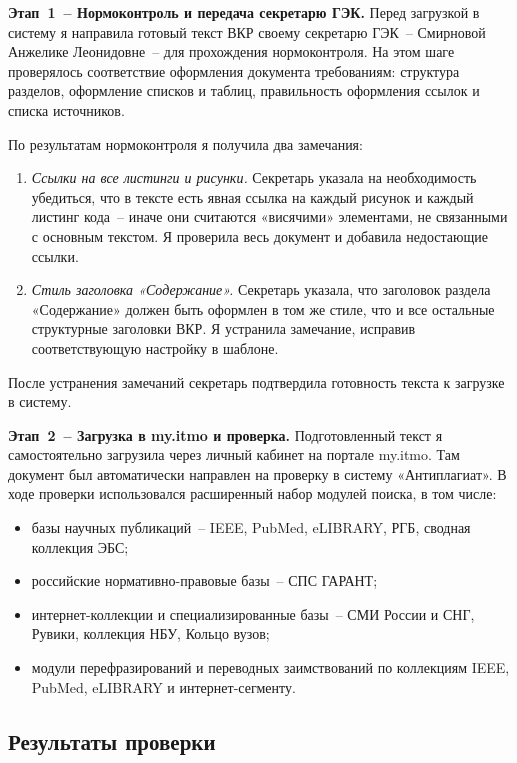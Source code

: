 \documentclass{itmo-vkr}
\begin{document}
\textbf{Этап~1~-- Нормоконтроль и передача секретарю ГЭК.} Перед загрузкой в систему я направила готовый текст ВКР своему секретарю ГЭК~-- Смирновой Анжелике Леонидовне~-- для прохождения нормоконтроля. На этом шаге проверялось соответствие оформления документа требованиям: структура разделов, оформление списков и таблиц, правильность оформления ссылок и списка источников.

По результатам нормоконтроля я получила два замечания:
\begin{enumerate}
    \item \textit{Ссылки на все листинги и рисунки.} Секретарь указала на необходимость убедиться, что в тексте есть явная ссылка на каждый рисунок и каждый листинг кода~-- иначе они считаются «висячими» элементами, не связанными с основным текстом. Я проверила весь документ и добавила недостающие ссылки.
    \item \textit{Стиль заголовка «Содержание».} Секретарь указала, что заголовок раздела «Содержание» должен быть оформлен в том же стиле, что и все остальные структурные заголовки ВКР. Я устранила замечание, исправив соответствующую настройку в шаблоне.
\end{enumerate}

После устранения замечаний секретарь подтвердила готовность текста к загрузке в систему.

\textbf{Этап~2~-- Загрузка в my.itmo и проверка.} Подготовленный текст я самостоятельно загрузила через личный кабинет на портале my.itmo. Там документ был автоматически направлен на проверку в систему «Антиплагиат». В ходе проверки использовался расширенный набор модулей поиска, в том числе:
\begin{itemize}
    \item базы научных публикаций~-- IEEE, PubMed, eLIBRARY, РГБ, сводная коллекция ЭБС;
    \item российские нормативно-правовые базы~-- СПС ГАРАНТ;
    \item интернет-коллекции и специализированные базы~-- СМИ России и СНГ, Рувики, коллекция НБУ, Кольцо вузов;
    \item модули перефразирований и переводных заимствований по коллекциям IEEE, PubMed, eLIBRARY и интернет-сегменту.
\end{itemize}

\subsection{Результаты проверки}
\end{document}
